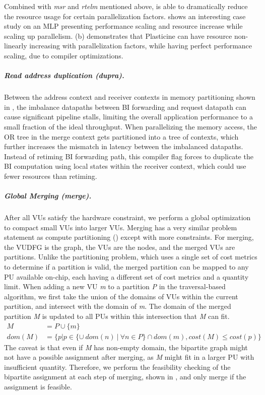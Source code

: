 Combined with \emph{msr} and \emph{rtelm} mentioned above, \name is able to 
dramatically reduce the resource usage for certain parallelization factors.
 shows an interesting case study on an MLP presenting performance scaling and resource
increase while scaling up parallelism.
 (b) demonstrates that Plasticine can have resource
non-linearly increasing with parallelization factors, while having perfect performance scaling, due to compiler optimizations.

\subparagraph{Read address duplication (dupra).} 
Between the address context and receiver contexts in memory partitioning shown in 
,
the imbalance datapaths between BI forwarding and request datapath can cause significant pipeline
stalls, limiting the overall application performance to a small fraction of the ideal throughput.
When parallelizing the memory access, the OR tree in the merge context gets partitioned into a tree
of contexts, which further increases the mismatch in latency between the imbalanced datapaths.
Instead of retiming BI forwarding path, 
this compiler flag forces \name to duplicate the BI computation using local states
within the receiver context, which could use fewer resources than retiming.

\subparagraph{Global Merging (merge).}
After all VUs satisfy the hardware constraint, we perform a global optimization to compact small VUs into larger VUs. 
Merging has a very similar problem statement as compute partitioning () except with more constraints.
For merging, the VUDFG is the graph, the VUs are the nodes, and the merged VUs are partitions.
Unlike the partitioning problem, which uses a single set of cost metrics to determine if a partition
is valid, the merged partition
can be mapped to any PU available on-chip, each having a different set of cost metrics and a
quantity limit.
When adding a new VU \emph{m} to a partition \emph{P} in the traversal-based algorithm, 
we first take the union of the domains of VUs within the current partition, and
intersect with the domain of \emph{m}.
The domain of the merged partition \emph{M} is updated to all PUs within this intersection that \emph{M} can fit.
\begin{align}
  M &= P \cup \{m\} \\
  dom(M) &= \{ p | p \in \{\cup\ dom(n)\ |\ \forall n \in P\} \cap dom(m), cost(M) \leq cost(p) \}
\end{align}
The caveat is that even if \emph{M} has non-empty domain, the bipartite graph might not have a possible 
assignment after merging, as \emph{M} might fit in a larger PU with insufficient quantity.
Therefore, we perform the feasibility checking of the bipartite assignment at each step
of merging, shown in , and only merge if the assignment is feasible.

